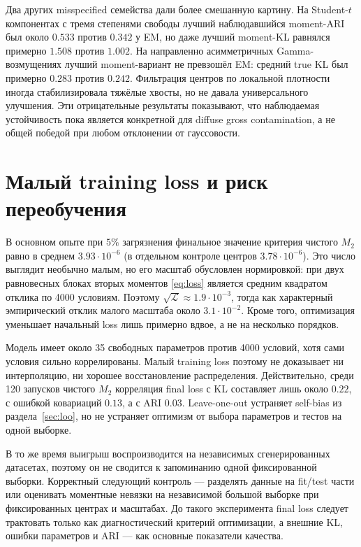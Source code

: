\documentclass[11pt,a4paper]{article}
\newcommand{\Mtwo}{M_2}
\begin{document}
Два других misspecified семейства дали более смешанную картину. На
Student-$t$ компонентах с тремя степенями свободы лучший наблюдавшийся
moment-ARI был около $0.533$ против $0.342$ у EM, но даже лучший moment-KL
равнялся примерно $1.508$ против $1.002$. На направленно асимметричных
Gamma-возмущениях лучший moment-вариант не превзошёл EM: средний true KL был
примерно $0.283$ против $0.242$. Фильтрация центров по локальной плотности
иногда стабилизировала тяжёлые хвосты, но не давала универсального улучшения.
Эти отрицательные результаты показывают, что наблюдаемая устойчивость пока
является конкретной для diffuse gross contamination, а не общей победой при
любом отклонении от гауссовости.

\section{Малый training loss и риск переобучения}

В основном опыте при $5\%$ загрязнения финальное значение критерия чистого
$\Mtwo$ равно в среднем $3.93\cdot10^{-6}$ (в отдельном контроле центров
$3.78\cdot10^{-6}$). Это число выглядит необычно малым, но его масштаб
обусловлен нормировкой: при двух равновесных блоках вторых моментов
\eqref{eq:loss} является средним квадратом отклика по 4000 условиям. Поэтому
$\sqrt{\mathcal L}\approx1.9\cdot10^{-3}$, тогда как характерный эмпирический
отклик малого масштаба около $3.1\cdot10^{-2}$. Кроме того, оптимизация
уменьшает начальный loss лишь примерно вдвое, а не на несколько порядков.

Модель имеет около 35 свободных параметров против 4000 условий, хотя сами
условия сильно коррелированы. Малый training loss поэтому не доказывает ни
интерполяцию, ни хорошее восстановление распределения. Действительно, среди
120 запусков чистого $\Mtwo$ корреляция final loss с KL составляет лишь около
$0.22$, с ошибкой ковариаций $0.13$, а с ARI $0.03$. Leave-one-out устраняет
self-bias из раздела~\ref{sec:loo}, но не устраняет оптимизм от выбора
параметров и тестов на одной выборке.

В то же время выигрыш воспроизводится на независимых сгенерированных
датасетах, поэтому он не сводится к запоминанию одной фиксированной выборки.
Корректный следующий контроль --- разделять данные на fit/test части или
оценивать моментные невязки на независимой большой выборке при фиксированных
центрах и масштабах. До такого эксперимента final loss следует трактовать
только как диагностический критерий оптимизации, а внешние KL, ошибки
параметров и ARI --- как основные показатели качества.
\end{document}
